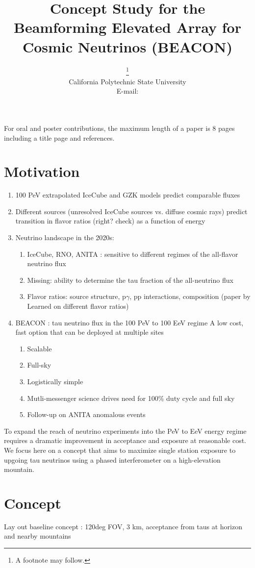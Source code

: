 \documentclass{PoS}
\title{Concept Study for the Beamforming Elevated Array for Cosmic Neutrinos (BEACON)}
\author{\speaker{Stephanie Wissel}\thanks{A footnote may follow.}\\
        California Polytechnic State University\\
        E-mail: \email{swissel@calpoly.edu}}
\begin{document}
For oral and poster contributions, the maximum length of a paper is 8 pages including a title page and references.
\section{Motivation}
\begin{enumerate}
    \item 100 PeV extrapolated IceCube and GZK models predict comparable fluxes
    \item Different sources (unresolved IceCube sources vs. diffuse cosmic rays) predict transition in flavor ratios (right? check) as a function of energy
    \item Neutrino landscape in the 2020s:
        \begin{enumerate}
            \item IceCube, RNO, ANITA : sensitive to different regimes of the all-flavor neutrino flux
            \item Missing: ability to determine the tau fraction of the all-neutrino flux 
            \item Flavor ratios: source structure, p$\gamma$, pp interactions, composition (paper by Learned on different flavor ratios)
        \end{enumerate}
    \item BEACON : tau neutrino flux in the 100 PeV to 100 EeV regime
A low cost, fast option that can be deployed at multiple sites
    \begin{enumerate}
        \item Scalable
        \item Full-sky
        \item Logistically simple
        \item Mutli-messenger science drives need for 100\% duty cycle and full sky
        \item Follow-up on ANITA anomalous events
    \end{enumerate}
\end{enumerate}

To expand the reach of neutrino experiments into the PeV to EeV energy regime requires a dramatic improvement in acceptance and exposure at reasonable cost. We focus here on a concept that aims to maximize single station exposure to upgoing tau neutrinos using a phased interferometer on a high-elevation mountain. 

\section{Concept}
Lay out baseline concept : 120deg FOV, 3 km, acceptance from taus at horizon and nearby mountains
\end{document}

